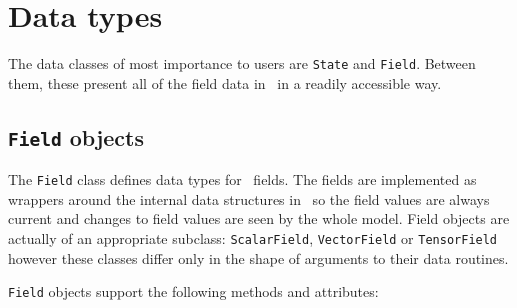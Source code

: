 \section{Data types}

The data classes of most importance to users are
\lstinline[language=Python]+State+ and
\lstinline[language=Python]+Field+. Between them, these present all of the
field data in \fluidity\ in a readily accessible way.

\subsection{\lstinline[language=Python]+Field+ objects}

The \lstinline[language=Python]+Field+ class defines data types for
\fluidity\ fields. The fields are implemented as wrappers around the
internal data structures in \fluidity\ so the field values are always
current and changes to field values are seen by the whole model. Field
objects are actually of an appropriate subclass:
\lstinline[language=Python]+ScalarField+,
\lstinline[language=Python]+VectorField+ or
\lstinline[language=Python]+TensorField+ however these classes differ only
in the shape of arguments to their data routines.

\lstinline+Field+ objects support the following methods and attributes:

